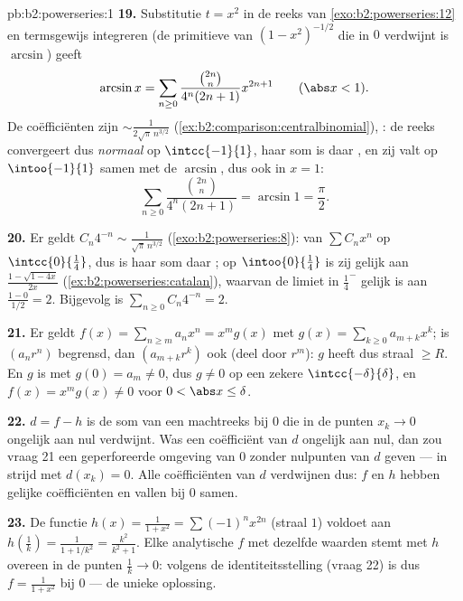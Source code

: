 \begin{solution}{pb:b2:powerseries:1}
\textbf{19.} Substitutie $t = x^2$ in de reeks van
\cref{exo:b2:powerseries:12} en termsgewijs integreren (de
primitieve van $(1-x^2)^{-1/2}$ die in $0$ verdwijnt is $\arcsin$)
geeft
\[
\arcsin x = \sum_{n\geq0}
\frac{\binom{2n}n}{4^n(2n+1)}x^{2n+1}
\qquad(\abs x < 1) .
\]
De coëfficiënten zijn $\sim \frac{1}{2\sqrt\pi\,n^{3/2}}$
(\cref{ex:b2:comparison:centralbinomial}), : de reeks
convergeert dus \emph{normaal} op $\intcc{-1}{1}$, haar som is daar
, en zij valt op $\intoo{-1}{1}$ samen met de 
$\arcsin$, dus ook in $x = 1$:
\[
\sum_{n\geq0}\frac{\binom{2n}n}{4^n(2n+1)}
= \arcsin 1 = \frac\pi2 .
\]

\textbf{20.} Er geldt $C_n4^{-n} \sim \frac{1}{\sqrt\pi\,n^{3/2}}$
(\cref{exo:b2:powerseries:8}):  van $\sum
C_nx^n$ op $\intcc{0}{\frac14}$, dus is haar som daar ; op
$\intoo{0}{\frac14}$ is zij gelijk aan
$\frac{1-\sqrt{1-4x}}{2x}$ (\cref{ex:b2:powerseries:catalan}),
waarvan de limiet in $\frac14^-$ gelijk is aan $\frac{1-0}{1/2} =
2$. Bijgevolg is $\sum_{n\geq0} C_n4^{-n} = 2$.

\textbf{21.} Er geldt $f(x) = \sum_{n\geq m}a_nx^n = x^m g(x)$ met
$g(x) = \sum_{k\geq0}a_{m+k}x^k$; is $(a_nr^n)$ begrensd, dan
$(a_{m+k}r^k)$ ook (deel door $r^m$): $g$ heeft dus straal $\geq
R$. En $g$ is  met $g(0) = a_m \neq 0$, dus $g \neq 0$ op
een zekere $\intcc{-\delta}{\delta}$, en $f(x) = x^mg(x) \neq 0$
voor $0 < \abs x \leq \delta$.

\textbf{22.} $d = f - h$ is de som van een machtreeks bij $0$ die
in de punten $x_k \to 0$ ongelijk aan nul verdwijnt. Was een
coëfficiënt van $d$ ongelijk aan nul, dan zou vraag 21 een
geperforeerde omgeving van $0$ zonder nulpunten van $d$ geven --- in
strijd met $d(x_k) = 0$. Alle coëfficiënten van $d$ verdwijnen dus:
$f$ en $h$ hebben gelijke coëfficiënten en vallen bij $0$ samen.

\textbf{23.} De functie $h(x) = \frac{1}{1+x^2} =
\sum(-1)^nx^{2n}$ (straal $1$) voldoet aan $h(\frac1k) = \frac{1}{1
+ 1/k^2} = \frac{k^2}{k^2+1}$. Elke analytische $f$ met dezelfde
waarden stemt met $h$ overeen in de punten $\frac1k \to 0$: volgens
de identiteitsstelling (vraag 22) is dus $f = \frac{1}{1+x^2}$ bij
$0$ --- de unieke oplossing.


\end{solution}
